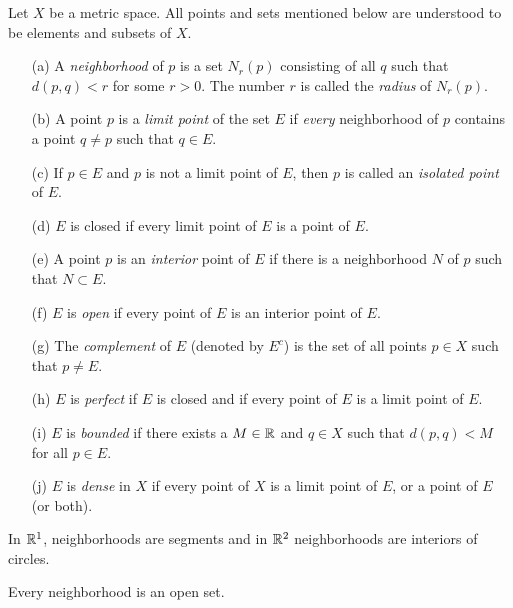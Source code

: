 \documentclass[11pt,a4paper]{book}
\begin{document}
\begin{definition}[ ]
    Let \( X  \) be a metric space. All points and sets mentioned below are understood to be elements and subsets of \( X  \).
    \begin{enumerate}
        \item[(a)] A \textit{neighborhood} of \( p  \) is a set \( {N}_{r}(p) \) consisting of all \( q  \) such that \( d(p,q) < r  \) for some \( r > 0  \). The number \( r  \) is called the \textit{radius} of \( {N}_{r}(p) \). 
        \item[(b)] A point \( p  \) is a \textit{limit point} of the set \( E  \) if \textit{every} neighborhood of \( p  \) contains a point \( q \neq p  \) such that \( q \in E  \).
        \item[(c)] If \( p \in E  \) and \( p  \) is not a limit point of \( E  \), then \( p  \) is called an \textit{isolated point} of \( E  \).
        \item[(d)] \( E  \) is closed if every limit point of \( E  \) is a point of \( E  \).
        \item[(e)] A point \( p  \) is an \textit{interior} point of \( E  \) if there is a neighborhood \( N  \) of \( p  \) such that \( N \subset E  \).
        \item[(f)] \( E  \) is \textit{open} if every point of \( E  \) is an interior point of \( E  \). 
        \item[(g)] The \textit{complement} of \( E  \) (denoted by \( E^{c} \)) is the set of all points \( p \in X  \) such that \( p \neq E  \).
        \item[(h)] \( E  \) is \textit{perfect} if \( E  \) is closed and if every point of \( E  \) is a limit point of \( E  \).
        \item[(i)] \( E  \) is \textit{bounded} if there exists a \( M \in \mathbb{R}  \) and \( q \in X  \) such that \( d(p,q) < M  \) for all \( p \in E  \).
        \item[(j)] \( E  \) is \textit{dense} in \(  X  \) if every point of \( X  \) is a limit point of \( E  \), or a point of \( E  \) (or both).  
    \end{enumerate}
\end{definition}

\begin{remark}
    In \( \mathbb{R}^{1} \), neighborhoods are segments and in \( \mathbb{R}^{2} \) neighborhoods are interiors of circles.
\end{remark}

\begin{theorem}
    Every neighborhood is an open set.
\end{theorem}
\end{document}

